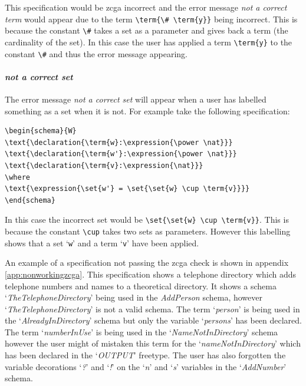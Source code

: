 This specification would be \gls{zcga} incorrect and the error message \emph{not
a correct term} would appear due to the term \verb|\term{\# \term{y}}| being
incorrect. This is because the constant \verb|\#| takes a set as a parameter and
gives back a term (the cardinality of the set). In this case the user has
applied a term \verb|\term{y}| to the constant \verb|\#| and thus the error
message appearing.

\paragraph{\emph{not a correct set}}

The error message \emph{not a correct set} will appear when a user has labelled
something as a set when it is not. For example take the following specification:

\begin{exam}
\begin{verbatim}       
\begin{schema}{W}
\text{\declaration{\term{w}:\expression{\power \nat}}}
\text{\declaration{\term{w'}:\expression{\power \nat}}}
\text{\declaration{\term{v}:\expression{\nat}}}
\where
\text{\expression{\set{w'} = \set{\set{w} \cup \term{v}}}}
\end{schema}
\end{verbatim}
\end{exam}

In this case the incorrect set would be \verb|\set{\set{w} \cup \term{v}}|. This
is because the constant \verb|\cup| takes two sets as parameters. However this
labelling shows that a set `\verb|w|' and a term `\verb|v|' have been applied. 

An example of a specification not passing the \gls{zcga} check is shown in
appendix \ref{app:nonworkingzcga}. This specification shows a telephone directory
which adds telephone numbers and names to a theoretical directory. It shows a
schema `\emph{TheTelephoneDirectory}' being used in the \emph{AddPerson}
schema, however `\emph{TheTelephoneDirectory}' is not a valid schema. The term
`\emph{person}' is being used in the `\emph{AlreadyInDirectory}' schema but only
the variable `\emph{persons}' has been declared. The term `\emph{numberInUse}'
is being used in the `\emph{NameNotInDirectory}' schema however the user might
of mistaken this term for the `\emph{nameNotInDirectory}' which has been
declared in the `\emph{OUTPUT}' freetype. The user has also forgotten the
variable decorations `\emph{?}' and `\emph{!}' on the `\emph{n}' and `\emph{s}'
variables in the `\emph{AddNumber}' schema.

